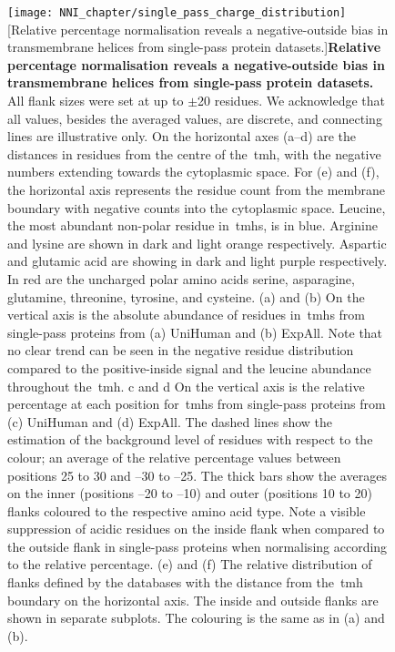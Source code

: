 \begin{figure}[p]
\centering
\texttt{[image: NNI\_chapter/single\_pass\_charge\_distribution]}
[Relative percentage normalisation reveals a negative-outside bias in transmembrane helices from single\--pass protein datasets.]{\textbf{Relative percentage normalisation reveals a negative-outside bias in transmembrane helices from single\--pass protein datasets.} All flank sizes were set at up to $\pm$20 residues.
We acknowledge that all values, besides the averaged values, are discrete, and connecting lines are illustrative only.
On the horizontal axes (a–d) are the distances in residues from the centre of the~\gls{tmh}, with the negative numbers extending towards the cytoplasmic space.
For (e) and (f), the horizontal axis represents the residue count from the membrane boundary with negative counts into the cytoplasmic space.
Leucine, the most abundant non-polar residue in~\gls{tmh}s, is in blue.
Arginine and lysine are shown in dark and light orange respectively.
Aspartic and glutamic acid are showing in dark and light purple respectively.
In red are the uncharged polar amino acids serine, asparagine, glutamine, threonine, tyrosine, and cysteine.
(a) and (b) On the vertical axis is the absolute abundance of residues in~\gls{tmh}s from single\--pass proteins from (a) UniHuman and (b) ExpAll.
Note that no clear trend can be seen in the negative residue distribution compared to the positive-inside signal and the leucine abundance throughout the~\gls{tmh}.
c and d On the vertical axis is the relative percentage at each position for~\gls{tmh}s from single\--pass proteins from (c) UniHuman and (d) ExpAll.
The dashed lines show the estimation of the background level of residues with respect to the colour; an average of the relative percentage values between positions 25 to 30 and –30 to –25.
The thick bars show the averages on the inner (positions –20 to –10) and outer (positions 10 to 20) flanks coloured to the respective amino acid type.
Note a visible suppression of acidic residues on the inside flank when compared to the outside flank in single\--pass proteins when normalising according to the relative percentage.
(e) and (f) The relative distribution of flanks defined by the databases with the distance from the~\gls{tmh} boundary on the horizontal axis.
The inside and outside flanks are shown in separate subplots.
The colouring is the same as in (a) and (b).}


\label{fig:single_pass_charge_distribution}
\end{figure}

